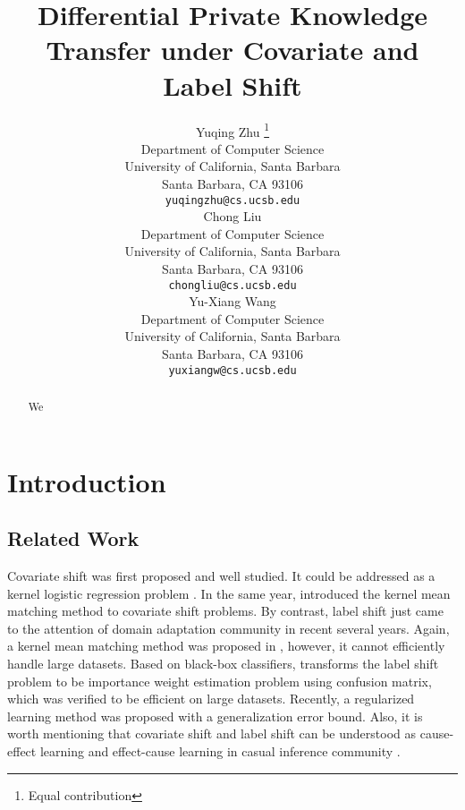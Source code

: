 \documentclass{article}
\title{Differential Private Knowledge Transfer  under Covariate and Label Shift}
\author{
	Yuqing Zhu \thanks{Equal contribution}\\
	Department of Computer Science \\
	University of California, Santa Barbara \\
	Santa Barbara, CA 93106 \\
	\texttt{yuqingzhu@cs.ucsb.edu} \\
	\And
	Chong Liu \printfnsymbol{1} \\
	Department of Computer Science \\
	University of California, Santa Barbara \\
	Santa Barbara, CA 93106 \\
	\texttt{chongliu@cs.ucsb.edu} \\
	\And
	Yu-Xiang Wang \\
	Department of Computer Science \\
	University of California, Santa Barbara \\
	Santa Barbara, CA 93106 \\
	\texttt{yuxiangw@cs.ucsb.edu} \\
}
\theoremstyle{definition}
\begin{document}
\maketitle

\begin{abstract}
    We
\end{abstract}

\section{Introduction}






% 


\subsection{Related Work}
\cite{papernot-iclr18-scalable}
\cite{bassily-nips18-model}
\cite{papernot-iclr17-semi}

\cite{dwork-14-the}

Covariate shift was first proposed and well studied. It could be addressed as a kernel logistic regression problem \cite{bickel-jmlr09-discriminative}. In the same year, \cite{gretton-chapter-covariate} introduced the kernel mean matching method to covariate shift problems. By contrast, label shift just came to the attention of domain adaptation community in recent several years. Again, a kernel mean matching method was proposed in \cite{zhang-icml13-domain}, however, it cannot efficiently handle large datasets. Based on black-box classifiers, \cite{lipton-icml18-detecting} transforms the label shift problem to be importance weight estimation problem using confusion matrix, which was verified to be efficient on large datasets. Recently, a regularized learning method \cite{azizzadenesheli-iclr18-regularized} was proposed with a generalization error bound. Also, it is worth mentioning that covariate shift and label shift can be understood as cause-effect learning and effect-cause learning in casual inference community \cite{scholkopf-icml12-on}.
\end{document}
